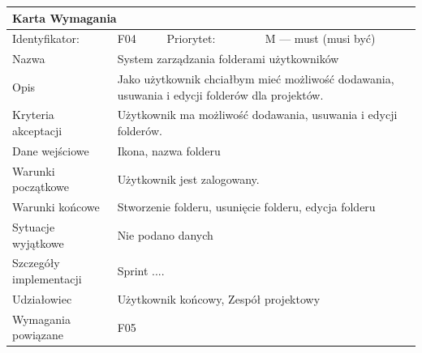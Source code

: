 \documentclass[a4paper,11pt]{report}
\begin{document}
		\begin{tabular}{|p{3cm}|p{2cm}|p{2cm}|p{6cm}|}
		\hline
		\multicolumn{4}{|p{12 cm}|}{Karta Wymagania}\\
		\hline
		Identyfikator: & F04 & Priorytet: & M — must (musi być)\\
		\hline
		Nazwa & \multicolumn{3}{|p{10 cm}|}{System zarządzania folderami użytkowników}\\
		\hline
		Opis & \multicolumn{3}{|p{10 cm}|}{Jako użytkownik chciałbym mieć możliwość dodawania, usuwania i edycji folderów dla projektów.}\\
		\hline
		Kryteria akceptacji & \multicolumn{3}{|p{10 cm}|}{Użytkownik ma możliwość dodawania, usuwania i edycji folderów.}\\
		\hline
		Dane wejściowe & \multicolumn{3}{|p{10 cm}|}{Ikona, nazwa folderu}\\
		\hline
		Warunki początkowe & \multicolumn{3}{|p{10 cm}|}{Użytkownik jest zalogowany.}\\
		\hline
		Warunki końcowe & \multicolumn{3}{|p{10 cm}|}{Stworzenie folderu, usunięcie folderu, edycja folderu}\\
		\hline
		Sytuacje wyjątkowe & \multicolumn{3}{|p{10 cm}|}{Nie podano danych}\\
		\hline
		Szczegóły implementacji & \multicolumn{3}{|p{10 cm}|}{Sprint ....}\\
		\hline
		Udziałowiec & \multicolumn{3}{|p{10 cm}|}{Użytkownik końcowy, Zespół projektowy}\\
		\hline
		Wymagania powiązane & \multicolumn{3}{|p{10 cm}|}{F05}\\
		\hline
		\end{tabular}\\
		\newline
		\vspace*{0,2 cm}
		\newline
\end{document}
